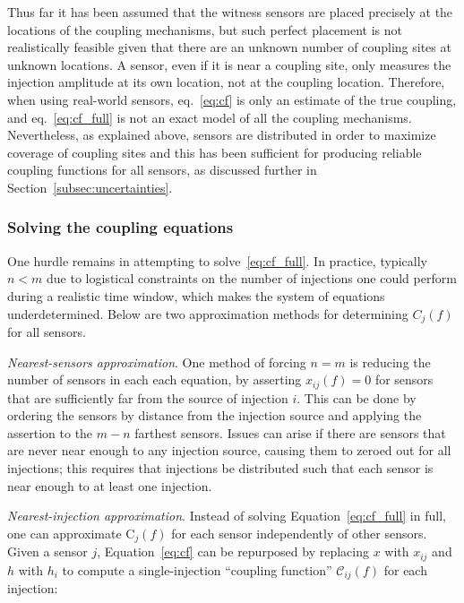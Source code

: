 Thus far it has been assumed that the witness sensors are placed precisely at the locations of the coupling mechanisms, but such perfect placement is not realistically feasible given that there are an unknown number of coupling sites at unknown locations.
A sensor, even if it is near a coupling site, only measures the injection amplitude at its own location, not at the coupling location.
Therefore, when using real-world sensors, eq.~\ref{eq:cf} is only an estimate of the true coupling, and eq.~\ref{eq:cf_full} is not an exact model of all the coupling mechanisms.
Nevertheless, as explained above, sensors are distributed in order to maximize coverage of coupling sites and this has been sufficient for producing reliable coupling functions for all sensors, as discussed further in Section~\ref{subsec:uncertainties}.

\subsubsection{Solving the coupling equations}

One hurdle remains in attempting to solve~\ref{eq:cf_full}.
In practice, typically $n<m$ due to logistical constraints on the number of injections one could perform during a realistic time window, which makes the system of equations underdetermined.
Below are two approximation methods for determining $C_j(f)$ for all sensors.

\textit{Nearest-sensors approximation}.
One method of forcing $n=m$ is reducing the number of sensors in each each equation, by asserting $x_{ij}(f)=0$ for sensors that are sufficiently far from the source of injection $i$.
This can be done by ordering the sensors by distance from the injection source and applying the assertion to the $m-n$ farthest sensors.
Issues can arise if there are sensors that are never near enough to any injection source, causing them to zeroed out for all injections; this requires that injections be distributed such that each sensor is near enough to at least one injection.

\textit{Nearest-injection approximation}.
Instead of solving Equation~\ref{eq:cf_full} in full, one can approximate $\mathrm{C}_j(f)$ for each sensor independently of other sensors.
Given a sensor $j$, Equation~\ref{eq:cf} can be repurposed by replacing $x$ with $x_{ij}$ and $h$ with $h_i$ to compute a single-injection ``coupling function'' $\mathcal{C}_{ij}(f)$ for each injection:

